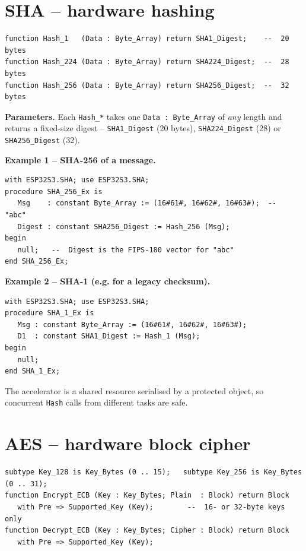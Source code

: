 \section{SHA -- hardware hashing}

\begin{lstlisting}
function Hash_1   (Data : Byte_Array) return SHA1_Digest;    --  20 bytes
function Hash_224 (Data : Byte_Array) return SHA224_Digest;  --  28 bytes
function Hash_256 (Data : Byte_Array) return SHA256_Digest;  --  32 bytes
\end{lstlisting}

\textbf{Parameters.} Each \texttt{Hash\_*} takes one \texttt{Data : Byte\_Array} of
\emph{any} length and returns a fixed-size digest -- \texttt{SHA1\_Digest}
(20 bytes), \texttt{SHA224\_Digest} (28) or \texttt{SHA256\_Digest} (32).

\textbf{Example 1 -- SHA-256 of a message.}
\begin{lstlisting}
with ESP32S3.SHA; use ESP32S3.SHA;
procedure SHA_256_Ex is
   Msg    : constant Byte_Array := (16#61#, 16#62#, 16#63#);  --  "abc"
   Digest : constant SHA256_Digest := Hash_256 (Msg);
begin
   null;   --  Digest is the FIPS-180 vector for "abc"
end SHA_256_Ex;
\end{lstlisting}

\textbf{Example 2 -- SHA-1 (e.g. for a legacy checksum).}
\begin{lstlisting}
with ESP32S3.SHA; use ESP32S3.SHA;
procedure SHA_1_Ex is
   Msg : constant Byte_Array := (16#61#, 16#62#, 16#63#);
   D1  : constant SHA1_Digest := Hash_1 (Msg);
begin
   null;
end SHA_1_Ex;
\end{lstlisting}

The accelerator is a shared resource serialised by a protected object, so
concurrent \texttt{Hash} calls from different tasks are safe.

\section{AES -- hardware block cipher}

\begin{lstlisting}
subtype Key_128 is Key_Bytes (0 .. 15);   subtype Key_256 is Key_Bytes (0 .. 31);
function Encrypt_ECB (Key : Key_Bytes; Plain  : Block) return Block
   with Pre => Supported_Key (Key);        --  16- or 32-byte keys only
function Decrypt_ECB (Key : Key_Bytes; Cipher : Block) return Block
   with Pre => Supported_Key (Key);
\end{lstlisting}

